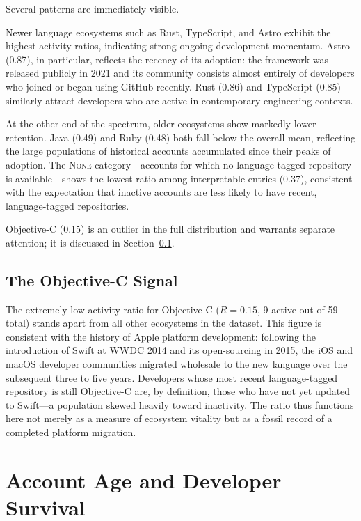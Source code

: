 \documentclass[12pt,a4paper]{article}
\begin{document}
Several patterns are immediately visible.

Newer language ecosystems such as Rust, TypeScript, and Astro exhibit the
highest activity ratios, indicating strong ongoing development momentum. Astro
(0.87), in particular, reflects the recency of its adoption: the framework was
released publicly in 2021 and its community consists almost entirely of
developers who joined or began using GitHub recently. Rust (0.86) and TypeScript
(0.85) similarly attract developers who are active in contemporary engineering
contexts.

At the other end of the spectrum, older ecosystems show markedly lower
retention. Java (0.49) and Ruby (0.48) both fall below the overall mean,
reflecting the large populations of historical accounts accumulated since their
peaks of adoption. The \textsc{None} category---accounts for which no
language-tagged repository is available---shows the lowest ratio among
interpretable entries (0.37), consistent with the expectation that inactive
accounts are less likely to have recent, language-tagged repositories.

Objective-C (0.15) is an outlier in the full distribution and warrants separate
attention; it is discussed in Section~\ref{sec:objc}.

\subsection{The Objective-C Signal}\label{sec:objc}

The extremely low activity ratio for Objective-C ($R = 0.15$, 9 active out of
59 total) stands apart from all other ecosystems in the dataset. This figure is
consistent with the history of Apple platform development: following the
introduction of Swift at WWDC 2014 and its open-sourcing in 2015, the iOS and
macOS developer communities migrated wholesale to the new language over the
subsequent three to five years. Developers whose most recent language-tagged
repository is still Objective-C are, by definition, those who have not yet
updated to Swift---a population skewed heavily toward inactivity. The ratio thus
functions here not merely as a measure of ecosystem vitality but as a fossil
record of a completed platform migration.

\section{Account Age and Developer Survival}
\end{document}
